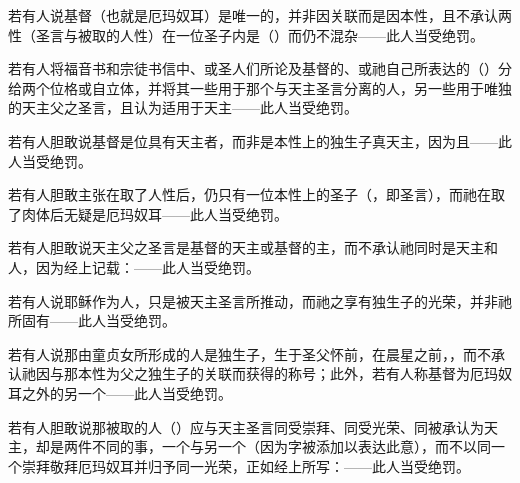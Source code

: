 若有人说基督（也就是厄玛奴耳）是唯一的，并非因关联而是因本性，且不承认两性（圣言与被取的人性）在一位圣子内是（）而仍不混杂——此人当受绝罚。\par

若有人将福音书和宗徒书信中、或圣人们所论及基督的、或祂自己所表达的（）分给两个位格或自立体，并将其一些用于那个与天主圣言分离的人，另一些用于唯独的天主父之圣言，且认为适用于天主——此人当受绝罚。\par

\par

若有人胆敢说基督是位具有天主者，而非是本性上的独生子真天主，因为且——此人当受绝罚。\par

若有人胆敢主张在取了人性后，仍只有一位本性上的圣子（，即圣言），而祂在取了肉体后无疑是厄玛奴耳——此人当受绝罚。\par

若有人胆敢说天主父之圣言是基督的天主或基督的主，而不承认祂同时是天主和人，因为经上记载：——此人当受绝罚。\par

\par

若有人说耶稣作为人，只是被天主圣言所推动，而祂之享有独生子的光荣，并非祂所固有——此人当受绝罚。\par

若有人说那由童贞女所形成的人是独生子，生于圣父怀前，在晨星之前，，而不承认祂因与那本性为父之独生子的关联而获得的称号；此外，若有人称基督为厄玛奴耳之外的另一个——此人当受绝罚。\par

若有人胆敢说那被取的人（）应与天主圣言同受崇拜、同受光荣、同被承认为天主，却是两件不同的事，一个与另一个（因为字被添加以表达此意），而不以同一个崇拜敬拜厄玛奴耳并归予同一光荣，正如经上所写：——此人当受绝罚。\par

